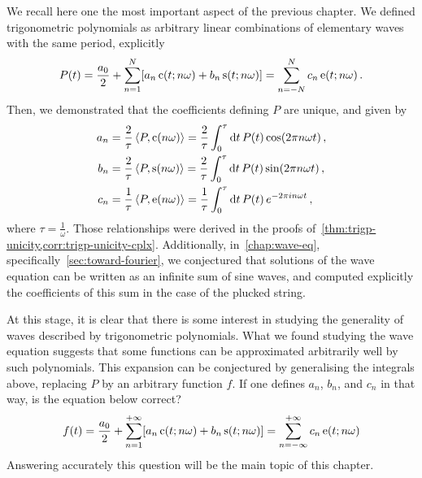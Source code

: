 We recall here one the most important aspect of the previous chapter. We defined
trigonometric polynomials as arbitrary linear combinations of elementary waves with the
same period, explicitly
\begin{equation}
  P(t)=\frac{a_0}{2}+\sum_{n=1}^N[a_n\operatorname{c}(t;n\omega)+b_n\operatorname{s}(t;n\omega)]=
  \sum_{n=-N}^{N}c_n\operatorname{e}(t;n\omega)\,.
\end{equation}
Then, we demonstrated that the coefficients defining $P$ are unique, and given by
\begin{align}
  a_n&=\frac{2}{\tau}\braket{P,\operatorname{c}(n\omega)}=\frac{2}{\tau}\int_0^{\tau}\mathrm{d} t\,P(t)\cos(2\pi n\omega t)\,,\\
  b_n&=\frac{2}{\tau}\braket{P,\operatorname{s}(n\omega)}=\frac{2}{\tau}\int_0^{\tau}\mathrm{d} t\,P(t)\sin(2\pi n\omega t)\,,\\
  c_n&=\frac{1}{\tau}\braket{P,\operatorname{e}(n\omega)}=\frac{1}{\tau}\int_0^{\tau}\mathrm{d} t\,P(t)\,e^{-2\pi i n\omega t}\,,
\end{align}
where $\tau=\frac{1}{\omega}$. Those relationships were derived in the proofs
of~\cref{thm:trigp-unicity,corr:trigp-unicity-cplx}. Additionally, in~\cref{chap:wave-eq},
specifically~\cref{sec:toward-fourier}, we conjectured that solutions of the wave equation
can be written as an infinite sum of sine waves, and computed explicitly the coefficients
of this sum in the case of the plucked string.

At this stage, it is clear that there is some interest in studying the generality of waves
described by trigonometric polynomials. What we found studying the wave equation suggests
that some functions can be approximated arbitrarily well by such polynomials. This
expansion can be conjectured by generalising the integrals above, replacing $P$ by an
arbitrary function $f$. If one defines $a_n$, $b_n$, and $c_n$ in that way, is the
equation below correct?
\begin{equation}
  f(t)=\frac{a_0}{2}+\sum_{n=1}^{+\infty}[a_n\operatorname{c}(t;n\omega)+b_n\operatorname{s}(t;n\omega)]=
  \sum_{n=-\infty}^{+\infty}c_n\operatorname{e}(t;n\omega)
\end{equation}
Answering accurately this question will be the main topic of this chapter.
